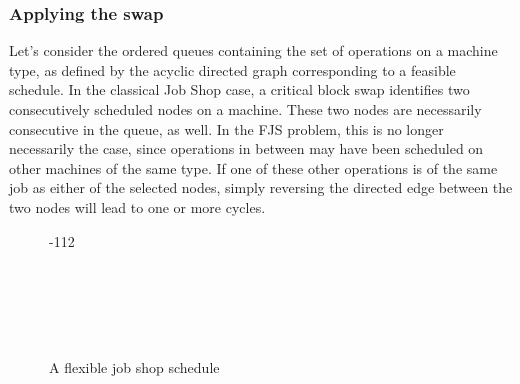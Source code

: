 \documentclass[a4paper,11pt]{article}
\begin{document}
\subsubsection{Applying the swap}

Let's consider the ordered queues containing the set of operations on a machine type, as defined by the acyclic directed graph corresponding to a feasible schedule. In the classical Job Shop case, a critical block swap identifies two consecutively scheduled nodes on a machine. These two nodes are necessarily consecutive in the queue, as well. In the FJS problem, this is no longer necessarily the case, since operations in between may have been scheduled on other machines of the same type. If one of these other operations is of the same job as either of the selected nodes, simply reversing the directed edge between the two nodes will lead to one or more cycles.

\begin{figure}[h]
\centering
\begin{ganttchart}[
		x unit=0.7cm,
		y unit chart=0.7cm,
		canvas/.style={draw=none,fill=none},
		vgrid,
		vgrid={*1{draw=black!12}},
		inline,
		group/.style={draw=none,fill=none},
		bar top shift=0.1,
		bar height=0.8,
		y unit title=0.5cm,
		title/.style={draw=none,fill=none},
		include title in canvas=false,
	]{-1}{12}

	 \\

	 \\

	 \\

	 \\
	

\end{ganttchart}
\caption{A flexible job shop schedule}
\label{fig:sch-swap}
\end{figure}
\end{document}
